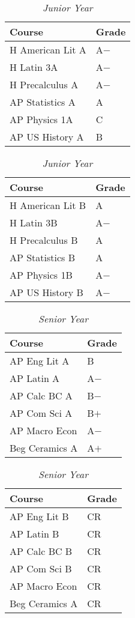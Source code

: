 \documentclass[12pt]{article}
\renewcommand{\it}[1]{\textit{{#1}}}
\begin{document}
\begin{table}[H]
    \centering
    \caption*{\it{Junior Year}}
    \vspace{-0.8em}
    \begin{tabular}{l|l}
        Course           & Grade \\
        \hline
        H American Lit A & A$-$ \\
        H Latin 3A       & A$-$ \\
        H Precalculus A  & A$-$ \\
        AP Statistics A  & A    \\
        AP Physics 1A    & C    \\
        AP US History A  & B    \\
    \end{tabular}
    \hspace{2em}
    \begin{tabular}{l|l}
        Course           & Grade \\
        \hline
        H American Lit B & A     \\
        H Latin 3B       & A$-$  \\
        H Precalculus B  & A     \\
        AP Statistics B  & A     \\
        AP Physics 1B    & A$-$  \\
        AP US History B  & A$-$  \\
    \end{tabular}
    \vspace{-1em}
\end{table}

\begin{table}[H]
    \centering
    \caption*{\it{Senior Year}}
    \vspace{-0.8em}
    \begin{tabular}{l|l}
        Course           & Grade \\
        \hline
        AP Eng Lit A     & B     \\
        AP Latin A       & A$-$  \\
        AP Calc BC A     & B$-$  \\
        AP Com Sci A     & B$+$  \\
        AP Macro Econ    & A$-$  \\
        Beg Ceramics A   & A$+$  \\
    \end{tabular}
    \hspace{2em}
    \begin{tabular}{l|l}
        Course           & Grade \\
        \hline
        AP Eng Lit B     & CR    \\
        AP Latin B       & CR    \\
        AP Calc BC B     & CR    \\
        AP Com Sci B     & CR    \\
        AP Macro Econ    & CR    \\
        Beg Ceramics A   & CR    \\
    \end{tabular}
\end{table}
\newpage
\end{document}
